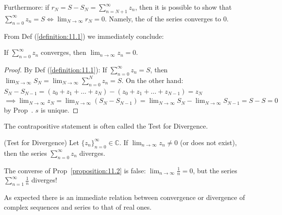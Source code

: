 \begin{remark}
Furthermore: if $r_N = S - S_N = \sum_{n=N+1}^{\infty} z_n$, then it is possible to show that $\sum_{n=0}^{\infty} z_n = S \iff \lim_{N \to \infty} r_N = 0$. 
Namely, the  of the series converges to 0.
\end{remark}
From Def (\ref{definition:11.1}) we immediately conclude:
\begin{proposition}\label{proposition:11.1} If $\sum_{n=0}^{\infty} z_n$ converges, then $\lim_{n \to \infty} z_n = 0$.
\begin{proof}
    By Def (\ref{definition:11.1}): If $\sum_{n=0}^{\infty} z_n = S$, then $\lim_{N \to \infty} S_N = \lim_{N \to \infty} \sum_{n=0}^{N} z_n = S$. On the other hand: $S_N - S_{N-1} = (z_0 + z_1 + \dots + z_N) - (z_0 + z_1 + \dots + z_{N-1}) = z_N$
    $\implies \lim_{N \to \infty} z_N = \lim_{N \to \infty} (S_N - S_{N-1}) = \lim_{N \to \infty} S_N - \lim_{N \to \infty} S_{N-1} = S - S = 0$ by Prop~. $s$ is unique.
\end{proof}
\end{proposition}
The contrapositive statement is often called the Test for Divergence.

\begin{proposition}\label{proposition:11.2} (Test for Divergence) Let $\{z_n\}_{n=0}^{\infty} \in \mathbb{C}$. If $\lim_{n \to \infty} z_n \neq 0$ (or does not exist), then the series $\sum_{n=0}^{\infty} z_n$ diverges.
\end{proposition}

\begin{remark}
The converse of Prop~\ref{proposition:11.2} is false: $\lim_{n \to \infty} \frac{1}{n} = 0$, but the series $\sum_{n=1}^{\infty} \frac{1}{n}$ diverges!
\end{remark}
As expected there is an immediate relation between convergence or divergence of complex sequences and series to that of real ones.

